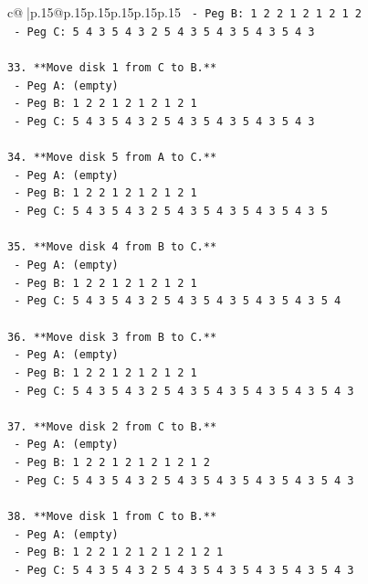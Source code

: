 \documentclass{article}
\begin{document}
{\begin{supertabular}{c@{$\;$}|p{.15\linewidth}@{}p{.15\linewidth}p{.15\linewidth}p{.15\linewidth}p{.15\linewidth}p{.15\linewidth}}
{{{\texttt{    {-} Peg B: 1 2 2 1 2 1 2 1 2} \\
\texttt{    {-} Peg C: 5 4 3 5 4 3 2 5 4 3 5 4 3 5 4 3 5 4 3} \\
\\ 
\texttt{33. **Move disk 1 from C to B.**} \\
\texttt{    {-} Peg A: (empty)} \\
\texttt{    {-} Peg B: 1 2 2 1 2 1 2 1 2 1} \\
\texttt{    {-} Peg C: 5 4 3 5 4 3 2 5 4 3 5 4 3 5 4 3 5 4 3} \\
\\ 
\texttt{34. **Move disk 5 from A to C.**} \\
\texttt{    {-} Peg A: (empty)} \\
\texttt{    {-} Peg B: 1 2 2 1 2 1 2 1 2 1} \\
\texttt{    {-} Peg C: 5 4 3 5 4 3 2 5 4 3 5 4 3 5 4 3 5 4 3 5} \\
\\ 
\texttt{35. **Move disk 4 from B to C.**} \\
\texttt{    {-} Peg A: (empty)} \\
\texttt{    {-} Peg B: 1 2 2 1 2 1 2 1 2 1} \\
\texttt{    {-} Peg C: 5 4 3 5 4 3 2 5 4 3 5 4 3 5 4 3 5 4 3 5 4} \\
\\ 
\texttt{36. **Move disk 3 from B to C.**} \\
\texttt{    {-} Peg A: (empty)} \\
\texttt{    {-} Peg B: 1 2 2 1 2 1 2 1 2 1} \\
\texttt{    {-} Peg C: 5 4 3 5 4 3 2 5 4 3 5 4 3 5 4 3 5 4 3 5 4 3} \\
\\ 
\texttt{37. **Move disk 2 from C to B.**} \\
\texttt{    {-} Peg A: (empty)} \\
\texttt{    {-} Peg B: 1 2 2 1 2 1 2 1 2 1 2} \\
\texttt{    {-} Peg C: 5 4 3 5 4 3 2 5 4 3 5 4 3 5 4 3 5 4 3 5 4 3} \\
\\ 
\texttt{38. **Move disk 1 from C to B.**} \\
\texttt{    {-} Peg A: (empty)} \\
\texttt{    {-} Peg B: 1 2 2 1 2 1 2 1 2 1 2 1} \\
\texttt{    {-} Peg C: 5 4 3 5 4 3 2 5 4 3 5 4 3 5 4 3 5 4 3 5 4 3} \\
\\ 
}}}
\end{supertabular}}
\end{document}
